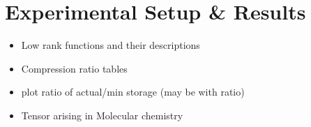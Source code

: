 \documentclass[runningheads]{llncs}
\begin{document}





\section{Experimental Setup \& Results}
\label{sec:expResults}
\begin{itemize}
	\item Low rank functions and their descriptions
	\item Compression ratio tables
	\item plot ratio of actual/min storage (may be with ratio)
	\item Tensor arising in Molecular chemistry
\end{itemize}
\end{document}
